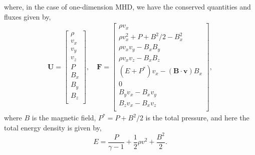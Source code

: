 \documentclass[iop,twocolumn]{emulateapj}
\begin{document}
where, in the case of one-dimension MHD, we have the conserved quantities and fluxes given by,
\begin{align*}
  {\bm U}=
  \begin{bmatrix}
    \rho \\
    v_x\\
    v_y\\
    v_z\\
    P\\
    B_x\\
    B_y\\
    B_z\\
  \end{bmatrix}
  ,\quad {\bm F}=
  \begin{bmatrix}
    \rho v_x \\
    \rho v_x^2+P+B^2/2-B_x^2\\
    \rho v_xv_y-B_xB_y\\
    \rho v_xv_z-B_xB_z\\
    (E+P^*)v_x-({\bm B}\cdot{\bm v})B_x\\
    0\\
    B_yv_x-B_xv_y\\
    B_zv_x-B_xv_z\\
  \end{bmatrix},
\end{align*}
where $B$ is the magnetic field, $P^*=P+B^2/2$ is the total pressure, and here the total energy density is given by,
\begin{equation*}
  E=\frac{P}{\gamma-1}+\frac{1}{2}\rho v^2+\frac{B^2}{2}.
\end{equation*}
\end{document}
